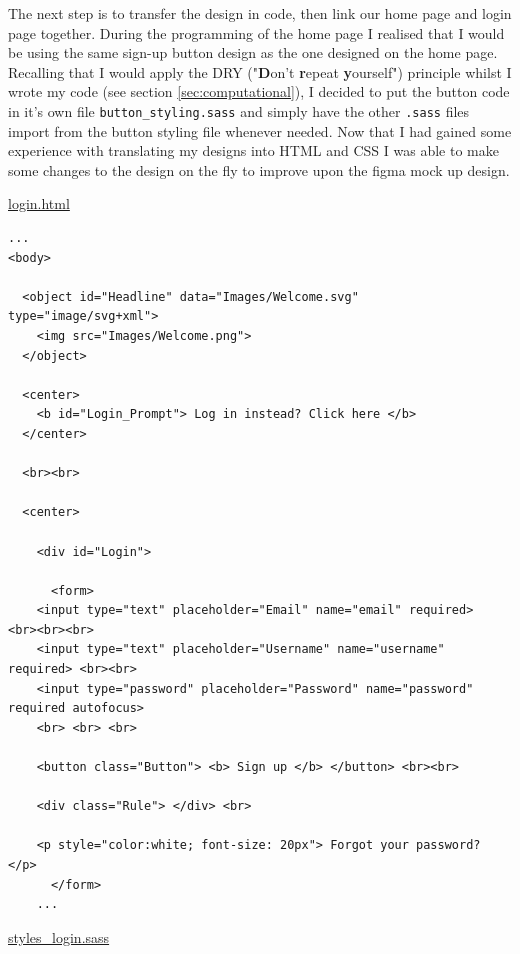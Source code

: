 The next step is to transfer the design in code, then link
our home page and login page together. During the programming
of the home page I realised that I would be using the same 
sign-up button design as the one designed on the home page.
Recalling that I would apply the DRY 
("\textbf{D}on't \textbf{r}epeat \textbf{y}ourself") principle 
whilst I wrote my code (see section \ref{sec:computational}), 
I decided to put the button code in it's own file 
\texttt{button\_styling.sass} and simply have the other \texttt{.sass}
files import from the button styling file whenever needed. Now
that I had gained some experience with translating my designs into 
HTML and CSS I was able to make some changes to the design on the 
fly to improve upon the figma mock up design. \\ \vspace{0.2cm}

\underline{login.html}

\begin{verbatim}
...
<body>

  <object id="Headline" data="Images/Welcome.svg" type="image/svg+xml">
    <img src="Images/Welcome.png">
  </object>

  <center>
    <b id="Login_Prompt"> Log in instead? Click here </b> 
  </center>

  <br><br>

  <center>

    <div id="Login">

      <form>
	<input type="text" placeholder="Email" name="email" required>       <br><br><br>
	<input type="text" placeholder="Username" name="username" required> <br><br>
	<input type="password" placeholder="Password" name="password" required autofocus> 
	<br> <br> <br>

	<button class="Button"> <b> Sign up </b> </button> <br><br>

	<div class="Rule"> </div> <br>

	<p style="color:white; font-size: 20px"> Forgot your password? </p>
      </form>
    ...
\end{verbatim}

\underline{styles\_login.sass}

